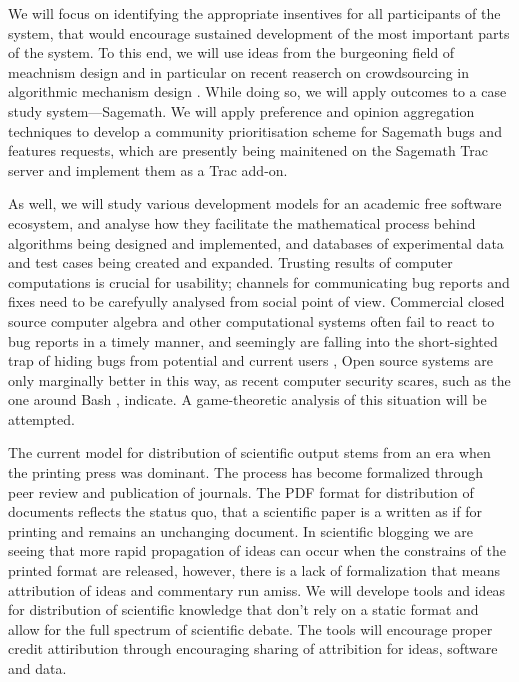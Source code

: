 \begin{workpackage}[id=social-aspects,wphases=12-24!.5,
  title=Social Aspects,
  UORM=1,USHRM=8]
\begin{wpdescription}
We will focus on identifying the appropriate insentives for all
participants of the system, that would encourage sustained development of the
most important parts of the system.  To this end, we will use ideas from the
burgeoning field of meachnism design \cite{AGTbook} and in
particular on recent reaserch on crowdsourcing in algorithmic mechanism design
\cite{crowds}.  While doing so, we will apply outcomes to a case study
system---Sagemath.
We will apply preference and opinion aggregation techniques \cite{pref-aggr} to  develop
a community prioritisation scheme for Sagemath bugs and features requests, which 
are presently being mainitened on the Sagemath Trac server \cite{trac-sagemath}  and implement
them as a Trac \cite{Trac} add-on.

As well, we will study various development models for an academic free software ecosystem,
and analyse how they facilitate the mathematical process behind algorithms being
designed and implemented,  and databases of experimental data and test cases being
created and expanded.
Trusting results of computer
computations is crucial for usability; channels for communicating bug reports
and fixes need to be carefyully analysed from social point of view. 
Commercial closed source computer algebra and other computational systems often
fail to react to bug reports in a timely manner, and seemingly are falling into the
short-sighted trap of hiding bugs from potential and current users \cite{misfort},
Open source  systems are only marginally better in this way, as recent
computer security scares, such as the one around Bash \cite{shellshock}, indicate.
A game-theoretic analysis of this situation will be attempted.
\end{wpdescription}

\begin{task}[title=Modern Distribution of Scientific Output]
  The current model for distribution of scientific output stems from an era when the printing press was dominant. The process has become formalized through peer review and publication of journals. The PDF format for distribution of documents reflects the status quo, that a scientific paper is a written as if for printing and remains an unchanging document. In scientific blogging we are seeing that more rapid propagation of ideas can occur when the constrains of the printed format are released, however, there is a lack of formalization that means attribution of ideas and commentary run amiss. We will develope tools and ideas for distribution of scientific knowledge that don't rely on a static format and allow for the full spectrum of scientific debate. The tools will encourage proper credit attiribution through encouraging sharing of attribition for ideas, software and data. 
\end{task}



\end{workpackage}
